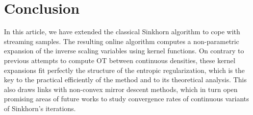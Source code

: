 
\section*{Conclusion}

In this article, we have extended the classical Sinkhorn algorithm to cope with streaming samples. The resulting online algorithm computes a non-parametric expansion of the inverse scaling variables using kernel functions. On contrary to previous attempts to compute OT between continuous densities, these kernel expansions fit perfectly the structure of the entropic regularization, which is the key to the practical efficiently of the method and to its theoretical analysis. 
%
This also draws links with non-convex mirror descent methods, which in turn open promising areas of future works to study convergence rates of continuous variants of Sinkhorn's iterations.
